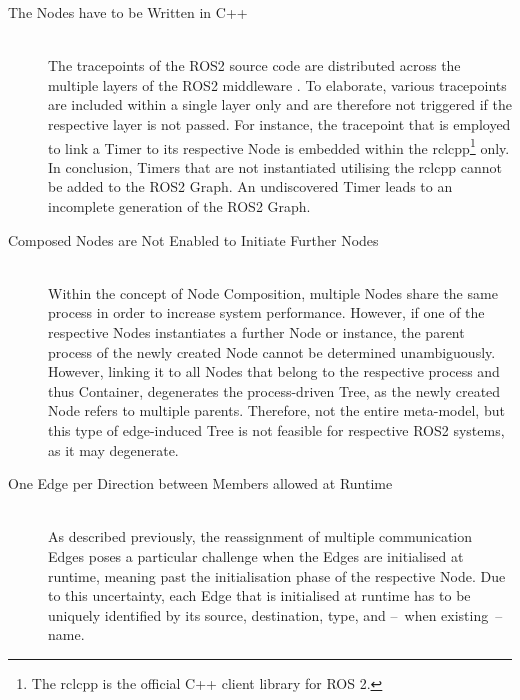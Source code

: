 \begin{description}
            \item [The Nodes have to be Written in C++] \hfill \\
                The tracepoints of the ROS2 source code are distributed across the multiple layers \cite{ros2layers} of the ROS2 middleware \cite{github:ros2_tracing}. To elaborate, various tracepoints are included within a single layer only and are therefore not triggered if the respective layer is not passed. For instance, the tracepoint that is employed to link a Timer to its respective Node is embedded within the rclcpp\footnote{The rclcpp is the official C++ client library for ROS 2.} only. In conclusion, Timers that are not instantiated utilising the rclcpp cannot be added to the ROS2 Graph. An undiscovered Timer leads to an incomplete generation of the ROS2 Graph.
            \item [Composed Nodes are Not Enabled to Initiate Further Nodes] \hfill \\
                Within the concept of Node Composition, multiple Nodes share the same process in order to increase system performance. However, if one of the respective Nodes instantiates a further Node or instance, the parent process of the newly created Node cannot be determined unambiguously. However, linking it to all Nodes that belong to the respective process and thus Container, degenerates the process-driven Tree, as the newly created Node refers to multiple parents. Therefore, not the entire meta-model, but this type of edge-induced Tree is not feasible for respective ROS2 systems, as it may degenerate.
            \item [One Edge per Direction between Members allowed at Runtime] \hfill \\
                As described previously, the reassignment of multiple communication Edges poses a particular challenge when the Edges are initialised at runtime, meaning past the initialisation phase of the respective Node. Due to this uncertainty, each Edge that is initialised at runtime has to be uniquely identified by its source, destination, type, and --~when existing~-- name.
        \end{description}

